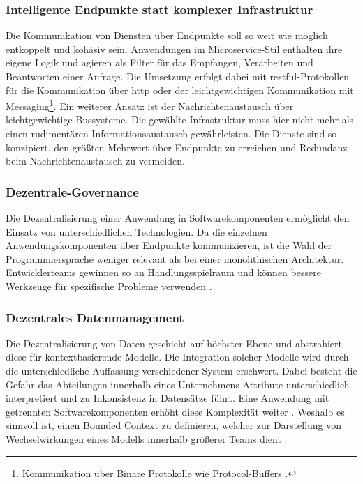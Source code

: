 \subsubsection{Intelligente Endpunkte statt komplexer Infrastruktur}
Die Kommunikation von Diensten über Endpunkte soll so weit wie möglich entkoppelt und kohäsiv sein.  
Anwendungen im Microservice-Stil enthalten ihre eigene Logik und agieren als Filter für das Empfangen, Verarbeiten und Beantworten einer Anfrage. 
Die Umsetzung erfolgt dabei mit \acs{rest}ful-Protokollen für die Kommunikation über \acs{http} oder der leichtgewichtigen Kommunikation mit Messaging\footnote{Kommunikation über Binäre Protokolle wie Protocol-Buffers \cite{ProtoBuf}.}.
Ein weiterer Ansatz ist der Nachrichtenaustausch über leichtgewichtige Bussysteme.
Die gewählte Infrastruktur muss hier nicht mehr als einen rudimentären Informationsaustausch gewährleisten. 
Die Dienste sind so konzipiert, den größten Mehrwert über Endpunkte zu erreichen und Redundanz beim Nachrichtenaustausch zu vermeiden.

\subsubsection{Dezentrale-Governance}
Die Dezentralisierung einer Anwendung in Softwarekomponenten ermöglicht den Einsatz von unterschiedlichen Technologien. 
Da die einzelnen Anwendungskomponenten über Endpunkte kommunizieren, ist die Wahl der Programmiersprache weniger relevant als bei einer monolithischen Architektur. 
Entwicklerteams gewinnen so an Handlungsspielraum und können bessere Werkzeuge für spezifische Probleme verwenden \cite{FowlerMicroservice}.

\subsubsection{Dezentrales Datenmanagement}
Die Dezentralisierung von Daten geschieht auf höchster Ebene und abstrahiert diese für kontextbasierende Modelle. 
Die Integration solcher Modelle wird durch die unterschiedliche Auffassung verschiedener System erschwert. 
Dabei besteht die Gefahr das Abteilungen innerhalb eines Unternehmens Attribute unterschiedlich interpretiert und zu Inkonsistenz in Datensätze führt.
Eine Anwendung mit getrennten Softwarekomponenten erhöht diese Komplexität weiter \cite{FowlerMicroservice}. 
Weshalb es sinnvoll ist, einen \glqq Bounded Context\grqq{} zu definieren, welcher zur Darstellung von Wechselwirkungen eines Modells innerhalb größerer Teams dient \cite{FowlerBoundedContext}. 

